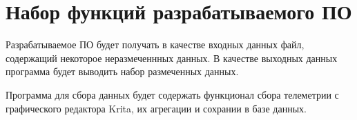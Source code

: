 \chapter{Набор функций разрабатываемого ПО}
Разрабатываемое ПО будет получать в качестве входных данных файл, содержащий некоторое неразмеченнных данных. В качестве выходных данных программа будет выводить набор размеченных данных.

Программа для сбора данных будет содержать функционал сбора телеметрии с графического редактора Krita, их агрегации и сохрании в базе данных.